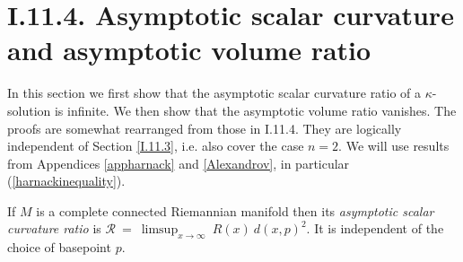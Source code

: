 \section{I.11.4. Asymptotic scalar curvature and asymptotic volume ratio}
\label{11.4proof}

In this section we first show that the asymptotic scalar curvature ratio of
a $\kappa$-solution is infinite.  We then show that the asymptotic
volume ratio vanishes. The proofs are somewhat rearranged from
those in I.11.4.  They are logically independent of
Section \ref{I.11.3}, i.e. also cover the case $n=2$.
We will use results from
Appendices \ref{appharnack} and \ref{Alexandrov},
in particular (\ref{harnackinequality}).

\begin{definition}
  \label{def:kl-asymptotic-scalar-curvature-asymptotic-volume-ratio-asymptotic-scalar-curvature-ratio-definition}

If $M$ is a complete connected Riemannian manifold then its {\em asymptotic
scalar curvature ratio} is ${\mathcal R} \: = \:
\limsup_{x \rightarrow \infty} \: R(x) \: d(x, p)^2$. It is independent
of the choice of basepoint $p$.
\end{definition}

